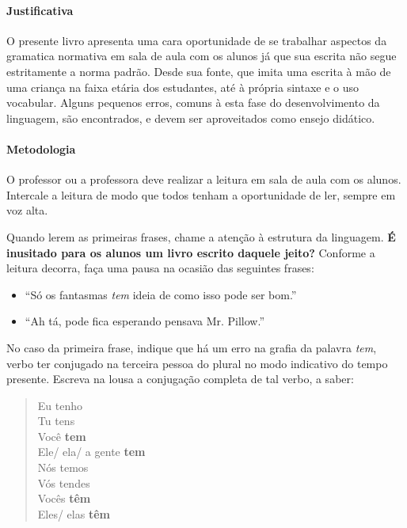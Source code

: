 \documentclass[11pt]{extarticle}
\begin{document}
\paragraph{Justificativa} O presente livro apresenta uma cara oportunidade 
de se trabalhar aspectos da gramatica normativa em sala de aula com os alunos
já que sua escrita não segue estritamente a norma padrão.
Desde sua fonte, que imita uma escrita à mão de uma criança na faixa etária
dos estudantes, até à própria sintaxe e o uso vocabular. Alguns pequenos erros,
comuns à esta fase do desenvolvimento da linguagem, são encontrados,
e devem ser aproveitados como ensejo didático. 

\paragraph{Metodologia} O professor ou a professora deve realizar a leitura
em sala de aula com os alunos. Intercale a leitura de modo que todos tenham a 
oportunidade de ler, sempre em voz alta. 

Quando lerem as primeiras frases, chame a atenção à estrutura da linguagem.
\textbf{É inusitado para os alunos um livro escrito daquele jeito?}
Conforme a leitura decorra, faça uma pausa na ocasião das seguintes frases:

\begin{itemize}
	\item ``Só os fantasmas \textit{tem} ideia de como isso pode ser bom.''
	\item ``Ah tá, pode fica esperando pensava Mr. Pillow.''
\end{itemize}




No caso da primeira frase, indique que há um erro na grafia da palavra
\textit{tem}, verbo ter conjugado na terceira pessoa do plural 
no modo indicativo do tempo presente. Escreva na lousa a conjugação
completa de tal verbo, a saber:

\begin{verse}
Eu tenho\\
Tu tens\\
Você \textbf{tem}\\
Ele/ ela/ a gente \textbf{tem}\\
Nós temos\\
Vós tendes\\
Vocês \textbf{têm}\\
Eles/ elas \textbf{têm}\\
\end{verse}
\end{document}
